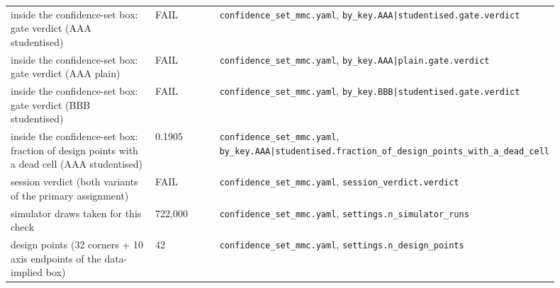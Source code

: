 \begin{longtable}{p{0.35\linewidth} p{0.14\linewidth} p{0.41\linewidth}}
inside the confidence-set box: gate verdict (AAA studentised) & FAIL & \texttt{\footnotesize confidence\_\allowbreak{}set\_\allowbreak{}mmc.\allowbreak{}yaml}, \texttt{\footnotesize by\_\allowbreak{}key.\allowbreak{}AAA|\allowbreak{}studentised.\allowbreak{}gate.\allowbreak{}verdict} \\
inside the confidence-set box: gate verdict (AAA plain) & FAIL & \texttt{\footnotesize confidence\_\allowbreak{}set\_\allowbreak{}mmc.\allowbreak{}yaml}, \texttt{\footnotesize by\_\allowbreak{}key.\allowbreak{}AAA|\allowbreak{}plain.\allowbreak{}gate.\allowbreak{}verdict} \\
inside the confidence-set box: gate verdict (BBB studentised) & FAIL & \texttt{\footnotesize confidence\_\allowbreak{}set\_\allowbreak{}mmc.\allowbreak{}yaml}, \texttt{\footnotesize by\_\allowbreak{}key.\allowbreak{}BBB|\allowbreak{}studentised.\allowbreak{}gate.\allowbreak{}verdict} \\
inside the confidence-set box: fraction of design points with a dead cell (AAA studentised) & 0.1905 & \texttt{\footnotesize confidence\_\allowbreak{}set\_\allowbreak{}mmc.\allowbreak{}yaml}, \texttt{\footnotesize by\_\allowbreak{}key.\allowbreak{}AAA|\allowbreak{}studentised.\allowbreak{}fraction\_\allowbreak{}of\_\allowbreak{}design\_\allowbreak{}points\_\allowbreak{}with\_\allowbreak{}a\_\allowbreak{}dead\_\allowbreak{}cell} \\
session verdict (both variants of the primary assignment) & FAIL & \texttt{\footnotesize confidence\_\allowbreak{}set\_\allowbreak{}mmc.\allowbreak{}yaml}, \texttt{\footnotesize session\_\allowbreak{}verdict.\allowbreak{}verdict} \\
simulator draws taken for this check & 722,000 & \texttt{\footnotesize confidence\_\allowbreak{}set\_\allowbreak{}mmc.\allowbreak{}yaml}, \texttt{\footnotesize settings.\allowbreak{}n\_\allowbreak{}simulator\_\allowbreak{}runs} \\
design points (32 corners + 10 axis endpoints of the data-implied box) & 42 & \texttt{\footnotesize confidence\_\allowbreak{}set\_\allowbreak{}mmc.\allowbreak{}yaml}, \texttt{\footnotesize settings.\allowbreak{}n\_\allowbreak{}design\_\allowbreak{}points} \\
\bottomrule
\end{longtable}

